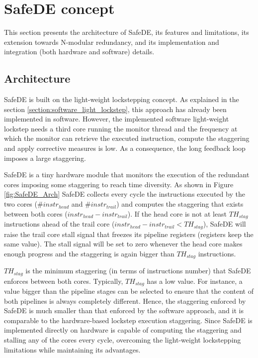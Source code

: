 \clearpage
\newpage
\section{SafeDE concept}

This section presents the architecture of SafeDE, its features and limitations, its extension towards N-modular redundancy, and its implementation and integration (both hardware and software) details.

\subsection{Architecture}

SafeDE is built on the light-weight lockstepping concept. As explained in the section \ref{section:software_light_lockstep}, this approach has already been implemented in software. However, the implemented software light-weight lockstep needs a third core running the monitor thread and the frequency at which the monitor can retrieve the executed instruction, compute the staggering and apply corrective measures is low. As a consequence, the long feedback loop imposes a large staggering. 

SafeDE is a tiny hardware module that monitors the execution of the redundant cores imposing some staggering to reach time diversity. As shown in Figure \ref{fig:SafeDE_Arch} SafeDE collects every cycle the instructions executed by the two cores ($\#instr_{head}$ and $\#instr_{trail}$) and computes the staggering that exists between both cores ($instr_{head} - instr_{trail}$). If the head core is not at least $TH_{stag}$ instructions ahead of the trail core ($instr_{head} - instr_{trail} < TH_{stag}$), SafeDE will raise the trail core stall signal that freezes its pipeline registers (registers keep the same value). The stall signal will be set to zero whenever the head core makes enough progress and the staggering is again bigger than $TH_{stag}$ instructions.

$TH_{stag}$ is the minimum staggering (in terms of instructions number) that SafeDE enforces between both cores. Typically, $TH_{stag}$ has a low value. For instance, a value bigger than the pipeline stages can be selected to ensure that the content of both pipelines is always completely different. Hence, the staggering enforced by SafeDE is much smaller than that enforced by the software approach, and it is comparable to the hardware-based lockstep execution staggering. Since SafeDE is implemented directly on hardware is capable of computing the staggering and stalling any of the cores every cycle, overcoming the light-weight lockstepping limitations while maintaining its advantages.

